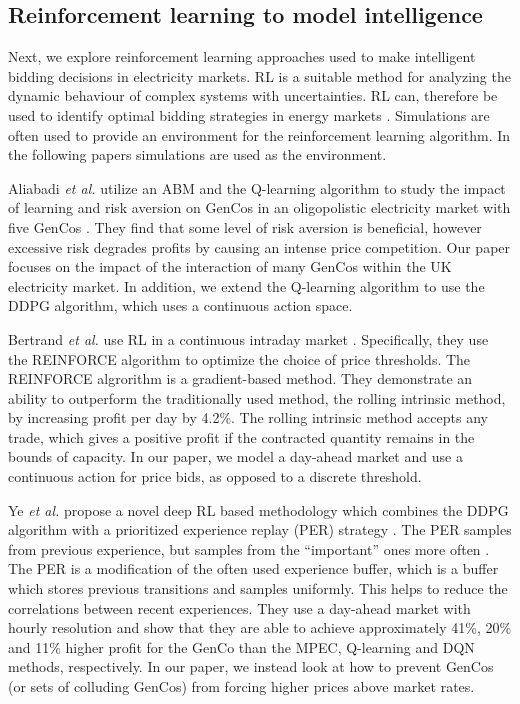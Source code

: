 \documentclass[conference]{IEEEtran}
\begin{document}
\subsection{Reinforcement learning to model intelligence}

Next, we explore reinforcement learning approaches used to make intelligent bidding decisions in electricity markets. RL is a suitable method for analyzing the dynamic behaviour of complex systems with uncertainties. RL can, therefore be used to identify optimal bidding strategies in energy markets \cite{Yang2020}. Simulations are often used to provide an environment for the reinforcement learning algorithm. In the following papers simulations are used as the environment.


Aliabadi \textit{et al.} utilize an ABM and the Q-learning algorithm to study the impact of learning and risk aversion on GenCos in an oligopolistic electricity market with five GenCos \cite{EsmaeiliAliabadi2017}. They find that some level of risk aversion is beneficial, however excessive risk degrades profits by causing an intense price competition. Our paper focuses on the impact of the interaction of many GenCos within the UK electricity market. In addition, we extend the Q-learning algorithm to use the DDPG algorithm, which uses a continuous action space.

Bertrand \textit{et al.} use RL in a continuous intraday market \cite{Bertrand2019}. Specifically, they use the REINFORCE algorithm to optimize the choice of price thresholds. The REINFORCE algrorithm is a gradient-based method. They demonstrate an ability to outperform the traditionally used method, the rolling intrinsic method, by increasing profit per day by 4.2\%. The rolling intrinsic method accepts any trade, which gives a positive profit if the contracted quantity remains in the bounds of capacity. In our paper, we model a day-ahead market and use a continuous action for price bids, as opposed to a discrete threshold.

Ye \textit{et al.} propose a novel deep RL based methodology which combines the DDPG algorithm with a prioritized experience replay (PER) strategy \cite{Ye2020a}. The PER samples from previous experience, but samples from the ``important'' ones more often \cite{Schaul2016}. The PER is a modification of the often used experience buffer, which is a buffer which stores previous transitions and samples uniformly. This helps to reduce the correlations between recent experiences. They use a day-ahead market with hourly resolution and show that they are able to achieve approximately 41\%, 20\% and 11\% higher profit for the GenCo than the MPEC, Q-learning and DQN methods, respectively. In our paper, we instead look at how to prevent GenCos (or sets of colluding GenCos) from forcing higher prices above market rates.
\end{document}
